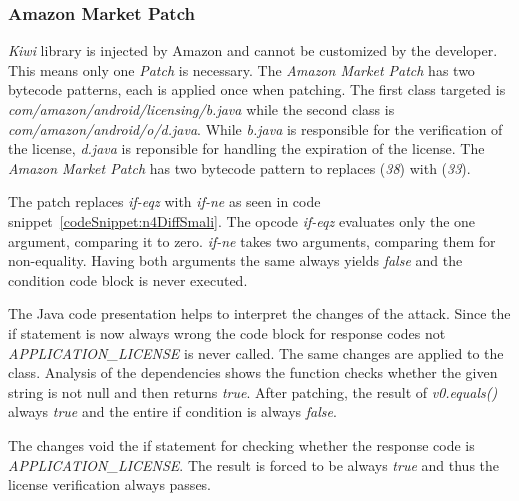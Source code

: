 \subsubsection{Amazon Market Patch}
\textit{Kiwi} library is injected by Amazon and cannot be customized by the developer.
This means only one \textit{Patch} is necessary.
The \textit{Amazon Market Patch} has two bytecode patterns, each is applied once when patching.
The first class targeted is \textit{com/amazon/android/licensing/b.java} while the second class is \textit{com/amazon/android/o/d.java}.
While \textit{b.java} is responsible for the verification of the license, \textit{d.java} is reponsible for handling the expiration of the license.
\newline
The \textit{Amazon Market Patch} has two bytecode pattern to replaces (\textit{38}) with (\textit{33}).
\newline

The patch replaces \textit{if-eqz} with \textit{if-ne} as seen in code snippet~\ref{codeSnippet:n4DiffSmali}.
The opcode \textit{if-eqz} evaluates only the one argument, comparing it to zero.
\textit{if-ne} takes two arguments, comparing them for non-equality.
Having both arguments the same always yields \textit{false} and the condition code block is never executed.

The Java code presentation helps to interpret the changes of the attack.
Since the if statement is now always wrong the code block for response codes not \textit{APPLICATION\_LICENSE} is never called.
The same changes are applied to the  class.
Analysis of the dependencies shows the function checks whether the given string is not null and then returns \textit{true}.
After patching, the result of \textit{v0.equals()} always \textit{true} and the entire if condition is always \textit{false}.
\newline

The changes void the if statement for checking whether the response code is \textit{APPLICATION\_LICENSE}.
The result is forced to be always \textit{true} and thus the license verification always passes.

